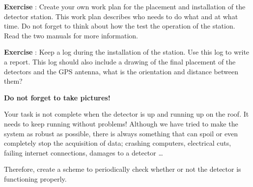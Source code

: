 \documentclass[12pt,a4paper]{article}
\numberwithin{equation}{section}
\numberwithin{figure}{section}
\newcounter{Exercise}
\numberwithin{table}{section}
\begin{document}
\begin{shaded}
\textbf{Exercise \theExercise {}} : Create your own work plan for the placement and installation of the detector station. This work plan describes who needs to do what and at what time. Do not forget to think about how the test the operation of the station. Read the two manuals for more information.\end{shaded}

\begin{shaded}
\textbf{Exercise \theExercise {}} : Keep a log during the installation of the station. Use this log to write a report. This log should also include a drawing of the final placement of the detectors and the GPS antenna, what is the orientation and distance between them?

\textbf{Do not forget to take pictures!}\end{shaded}

Your task is not complete when the detector is up and running up on the roof. It needs to keep running without problems! Although we have tried to make the system as robust as possible, there is always something that can spoil or even completely stop the acquisition of data; crashing computers, electrical cuts, failing internet connections, damages to a detector \ldots 

Therefore, create a scheme to periodically check whether or not the detector is functioning properly.
\end{document}
